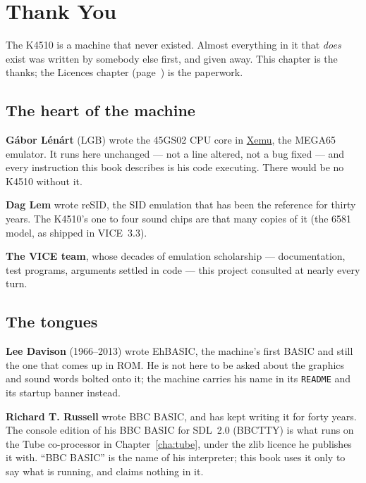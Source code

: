 \chapter{Thank You}\label{cha:thanks}
\begingroup
\setlength{\parindent}{0pt}
\setlength{\parskip}{5pt plus 1.5pt minus 1pt}

The K4510 is a machine that never existed. Almost everything in it
that \emph{does} exist was written by somebody else first, and given
away. This chapter is the thanks; the Licences chapter (page~\pageref{cha:licences})
is the paperwork.

\section{The heart of the machine}
\textbf{Gábor Lénárt} (LGB) wrote the 45GS02 CPU core in
\href{https://github.com/lgblgblgb/xemu}{Xemu}, the MEGA65 emulator.
It runs here unchanged --- not a line altered, not a bug fixed --- and
every instruction this book describes is his code executing. There
would be no K4510 without it.

\textbf{Dag Lem} wrote reSID, the SID emulation that has been the
reference for thirty years. The K4510's one to four sound chips are
that many copies of it (the 6581 model, as shipped in VICE~3.3).

\textbf{The VICE team}, whose decades of emulation scholarship ---
documentation, test programs, arguments settled in code --- this
project consulted at nearly every turn.

\section{The tongues}
\textbf{Lee Davison} (1966--2013) wrote EhBASIC, the machine's first
BASIC and still the one that comes up in ROM. He is not here to be
asked about the graphics and sound words bolted onto it; the machine
carries his name in its \verb|README| and its startup banner instead.

\textbf{Richard T. Russell} wrote BBC BASIC, and has kept writing it
for forty years. The console edition of his BBC BASIC for SDL~2.0
(BBCTTY) is what runs on the Tube co-processor in
Chapter~\ref{cha:tube}, under the zlib licence he publishes it with.
``BBC BASIC'' is the name of his interpreter; this book uses it only to
say what is running, and claims nothing in it.

